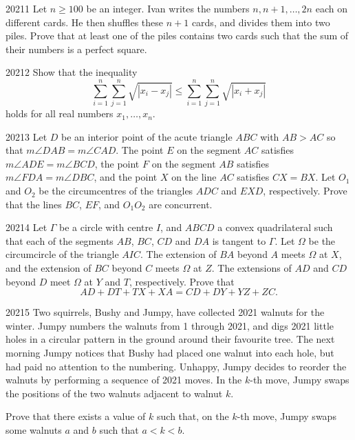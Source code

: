 
\begin{problem}{2021}{1}
Let $n\geq100$ be an integer. Ivan writes the numbers $n, n+1, \dots, 2n$ each on different cards. He then shuffles these $n+1$ cards, and divides them into two piles. Prove that at least one of the piles contains two cards such that the sum of their numbers is a perfect square.
\end{problem}

\begin{problem}{2021}{2}
Show that the inequality
\[
    \sum_{i=1}^{n}\sum_{j=1}^{n}\sqrt{|x_i-x_j|}
    \leq \sum_{i=1}^{n}\sum_{j=1}^{n}\sqrt{|x_i+x_j|}
\]
holds for all real numbers $x_1, \dots, x_n$.
\end{problem}

\begin{problem}{2021}{3}
Let $D$ be an interior point of the acute triangle $ABC$ with $AB>AC$ so that $m\angle DAB=m\angle CAD$. The point $E$ on the segment $AC$ satisfies $m\angle ADE=m\angle BCD$, the point $F$ on the segment $AB$ satisfies $m\angle FDA=m\angle DBC$, and the point $X$ on the line $AC$ satisfies $CX=BX$. Let $O_1$ and $O_2$ be the circumcentres of the triangles $ADC$ and $EXD$, respectively. Prove that the lines $BC$, $EF$, and $O_1O_2$ are concurrent.
\end{problem}

\begin{problem}{2021}{4}
Let $\Gamma$ be a circle with centre $I$, and $ABCD$ a convex quadrilateral such that each of the segments $AB$, $BC$, $CD$ and $DA$ is tangent to $\Gamma$. Let $\Omega$ be the circumcircle of the triangle $AIC$. The extension of $BA$ beyond $A$ meets $\Omega$ at $X$, and the extension of $BC$ beyond $C$ meets $\Omega$ at $Z$. The extensions of $AD$ and $CD$ beyond $D$ meet $\Omega$ at $Y$ and $T$, respectively. Prove that
\[
    AD+DT+TX+XA=CD+DY+YZ+ZC.
\]
\end{problem}

\begin{problem}{2021}{5}
Two squirrels, Bushy and Jumpy, have collected 2021 walnuts for the winter. Jumpy numbers the walnuts from 1 through 2021, and digs 2021 little holes in a circular pattern in the ground around their favourite tree. The next morning Jumpy notices that Bushy had placed one walnut into each hole, but had paid no attention to the numbering. Unhappy, Jumpy decides to reorder the walnuts by performing a sequence of 2021 moves. In the $k$-th move, Jumpy swaps the positions of the two walnuts adjacent to walnut $k$.

Prove that there exists a value of $k$ such that, on the $k$-th move, Jumpy swaps some walnuts $a$ and $b$ such that $a<k<b$.
\end{problem}

